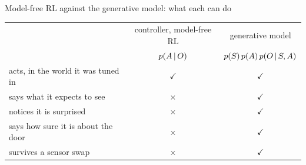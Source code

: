 \documentclass[10pt, aspectratio=169]{beamer}
\begin{document}
\begin{frame}{Model-free RL against the generative model: what each can do}
  \vfill
  \centering
  \renewcommand{\arraystretch}{1.35}
  \begin{tabular}{@{}l c c@{}}
    \toprule
     & controller, model-free RL & \alert{generative model} \\
     & $p(A\,|\, O)$ & $p(S)\,p(A)\,p(O\,|\, S,A)$ \\
    \midrule
    acts, in the world it was tuned in & $\checkmark$ & $\checkmark$ \\
    says what it expects to see        & $\times$ & $\checkmark$ \\
    notices it is surprised            & $\times$ & $\checkmark$ \\
    says how sure it is about the door & $\times$ & $\checkmark$ \\
    survives a sensor swap             & $\times$ & $\checkmark$ \\
    \bottomrule
  \end{tabular}
  \vfill
\end{frame}
\end{document}
